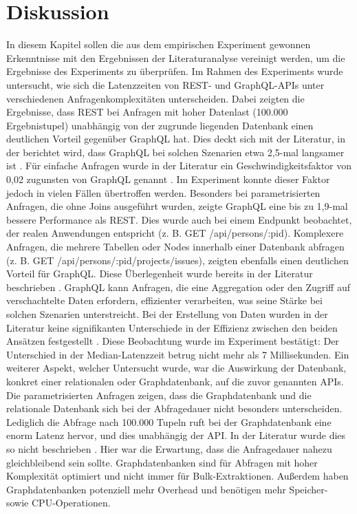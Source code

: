 \chapter{Diskussion} %
\label{sec:diskussion}
In diesem Kapitel sollen die aus dem empirischen Experiment gewonnen Erkenntnisse mit den Ergebnissen der Literaturanalyse vereinigt werden, um die Ergebnisse des Experiments zu überprüfen.
\newline
\noindent
Im Rahmen des Experiments wurde untersucht, wie sich die Latenzzeiten von REST- und GraphQL-APIs unter verschiedenen Anfragenkomplexitäten unterscheiden. Dabei zeigten die Ergebnisse, dass REST bei Anfragen mit hoher Datenlast (100.000 Ergebnistupel) unabhängig von der zugrunde liegenden Datenbank einen deutlichen Vorteil gegenüber GraphQL hat. Dies deckt sich mit der Literatur, in der berichtet wird, dass GraphQL bei solchen Szenarien etwa 2,5-mal langsamer ist \citep{restvsgraphql}.
\newline
\noindent
Für einfache Anfragen wurde in der Literatur ein Geschwindigkeitsfaktor von 0,02 zugunsten von GraphQL genannt \citep{migrategraphql}. Im Experiment konnte dieser Faktor jedoch in vielen Fällen übertroffen werden. Besonders bei parametrisierten Anfragen, die ohne Joins ausgeführt wurden, zeigte GraphQL eine bis zu 1,9-mal bessere Performance als REST. Dies wurde auch bei einem Endpunkt beobachtet, der realen Anwendungen entspricht (z. B. GET /api/persons/:pid).
\newline
\noindent
Komplexere Anfragen, die mehrere Tabellen oder Nodes innerhalb einer Datenbank abfragen (z. B. GET /api/persons/:pid/projects/issues), zeigten ebenfalls einen deutlichen Vorteil für GraphQL. Diese Überlegenheit wurde bereits in der Literatur beschrieben \citep{graphqlreplacerest}. GraphQL kann Anfragen, die eine Aggregation oder den Zugriff auf verschachtelte Daten erfordern, effizienter verarbeiten, was seine Stärke bei solchen Szenarien unterstreicht.
\newline
\noindent
Bei der Erstellung von Daten wurden in der Literatur keine signifikanten Unterschiede in der Effizienz zwischen den beiden Ansätzen festgestellt \citep{graphqlreplacerest}. Diese Beobachtung wurde im Experiment bestätigt: Der Unterschied in der Median-Latenzzeit betrug nicht mehr als 7 Millisekunden.
\newline
\noindent
Ein weiterer Aspekt, welcher Untersucht wurde, war die Auswirkung der Datenbank, konkret einer relationalen oder Graphdatenbank, auf die zuvor genannten APIs. Die parametrisierten Anfragen zeigen, dass die Graphdatenbank und die relationale Datenbank sich bei der Abfragedauer nicht besonders unterscheiden. Lediglich die Abfrage nach 100.000 Tupeln ruft bei der Graphdatenbank eine enorm Latenz hervor, und dies unabhängig der API. In der Literatur wurde dies so nicht beschrieben \citep{graphrelationaldb}. Hier war die Erwartung, dass die Anfragedauer nahezu gleichbleibend sein sollte. Graphdatenbanken sind für Abfragen mit hoher Komplexität optimiert und nicht immer für Bulk-Extraktionen. Außerdem haben Graphdatenbanken potenziell mehr Overhead und benötigen mehr Speicher- sowie CPU-Operationen.
